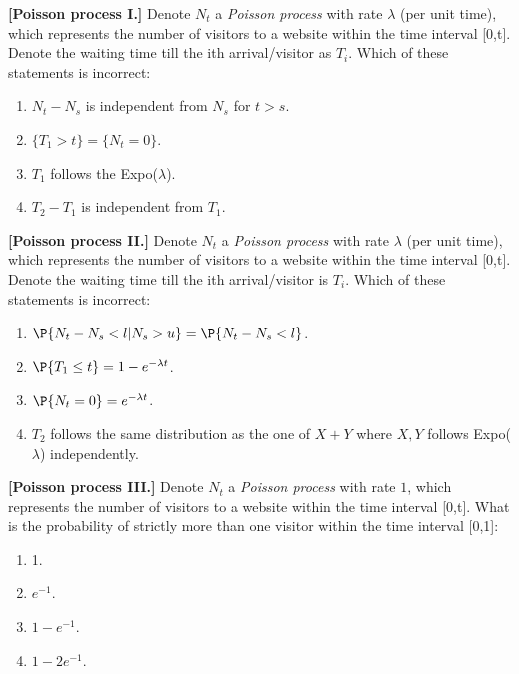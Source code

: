 \documentclass[poll_tutorial_format]{subfiles}
\begin{document}
	
	\begin{exercise}
	\textbf{[Poisson process I.]} Denote $N_t$ a \textit{Poisson process} with rate $\lambda$ (per unit time), which represents the number of visitors to a website within the time interval [0,t]. Denote the waiting time till the ith arrival/visitor as $T_i$. Which of these statements is incorrect: 
		\begin{enumerate}
			\item $N_t-N_s$ is independent from $N_s$ for $t>s$. 
			\item $\{T_1> t\}=\{N_t=0\}$.
			\item $T_1$ follows the Expo($\lambda$).
			\item $T_2-T_1$ is independent from $T_1$.
		\end{enumerate}
	\end{exercise}
	
	
	\begin{exercise}
	\textbf{[Poisson process II.]} Denote $N_t$ a \textit{Poisson process} with rate $\lambda$ (per unit time), which represents the number of visitors to a website within the time interval [0,t]. Denote the waiting time till the ith arrival/visitor is $T_i$. Which of these statements is incorrect: 
	\begin{enumerate}
		\item $\P{N_t-N_s <l|N_s>u}=\P{N_t-N_s <l}$. 
		\item $\P{T_1\leq t}= 1-e^{-\lambda t}$.
		\item $\P{N_t=0} = e^{-\lambda t}$.
		\item $T_2$ follows the same distribution as the one of $X+Y$ where $X,Y$ follows Expo($\lambda$) independently.
	\end{enumerate}
\end{exercise}
	
	

	\begin{exercise}
	\textbf{[Poisson process III.]} Denote $N_t$ a \textit{Poisson process} with rate $1$, which represents the number of visitors to a website within the time interval [0,t]. What is the probability of strictly more than one visitor within the time interval [0,1]: 
	\begin{enumerate}
		\item 1.
		\item $e^{-1}$.
		\item $1-e^{-1}$.
		\item $1-2e^{-1}$.
 	\end{enumerate}
\end{exercise}
\end{document}
